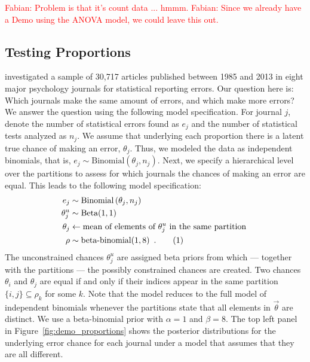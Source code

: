 \documentclass[11pt,a4paper]{article}
\theoremstyle{definition} %
\theoremstyle{case}
\newcommand{\numberthis}{\addtocounter{equation}{1}\tag{\theequation}}
\newcommand{\FD}[1]{\textcolor{red}{Fabian: #1 }}
\begin{document}


\FD{Problem is that it's count data ... hmmm.}
\FD{Since we already have a Demo using the ANOVA model, we could leave this out.}
\fi


\subsection{Testing Proportions}
\textcite{nuijten2016prevalence} investigated a sample of 30,717 articles published between 1985 and 2013 in eight major psychology journals for statistical reporting errors. Our question here is: Which journals make the same amount of errors, and which make more errors? We answer the question using the following model specification. For journal $j$, denote the number of statistical errors found as $e_j$ and the number of statistical tests analyzed as $n_j$. We assume that underlying each proportion there is a latent true chance of making an error, $\theta_j$. Thus, we modeled the data as independent binomials, that is, $e_j \sim \mathrm{Binomial}\left(\theta_j, n_j\right)$. Next, we specify a hierarchical level over the partitions to assess for which journals the chances of making an error are equal. This leads to the following model specification:
\begin{align*}
    e_j                 &\sim \mathrm{Binomial}\left(\theta_j, n_j\right)\\
    \theta^u_j          &\sim \text{Beta}(1, 1)\\
    \theta_j            &\leftarrow \text{mean of elements of } \theta^u_j \text{ in the same partition }\\
    \rho                &\sim \text{beta-binomial}(1, 8) \enspace . \numberthis
\end{align*}
The unconstrained chances $\theta^u_j$ are assigned beta priors from which — together with the partitions — the possibly constrained chances are created. Two chances $\theta_i$ and $\theta_j$ are equal if and only if their indices appear in the same partition $\{i, j\} \subseteq \rho_k$ for some $k$. Note that the model reduces to the full model of independent binomials whenever the partitions state that all elements in $\vec{\theta}$ are distinct. We use a beta-binomial prior with $\alpha = 1$ and $\beta = 8$. The top left panel in Figure~\ref{fig:demo_proportions} shows the posterior distributions for the underlying error chance for each journal under a model that assumes that they are all different.
\end{document}

